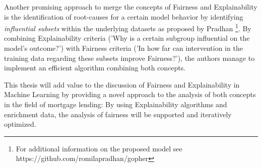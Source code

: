 




Another promising approach to merge the concepts of Fairness and Explainability is the identification of root-causes for a certain model behavior by identifying \textit{influential subsets} within the underlying datasets as proposed by Pradhan \parencite{Pradhan2022}\footnote{For additional information on the proposed model see https://github.com/romilapradhan/gopher}.
By combining Explainability criteria ('Why is a certain subgroup influential on the model's outcome?') with Fairness criteria ('In how far can intervention in the training data regarding these subsets improve Fairness?'), the authors manage to implement an efficient algorithm combining both concepts.


This thesis will add value to the discussion of Fairness and Explainability in Machine Learning by providing a novel approach to the analysis of both concepts in the field of mortgage lending: 
By using Explainability algorithms and enrichment data, the analysis of fairness will be supported and iteratively optimized.